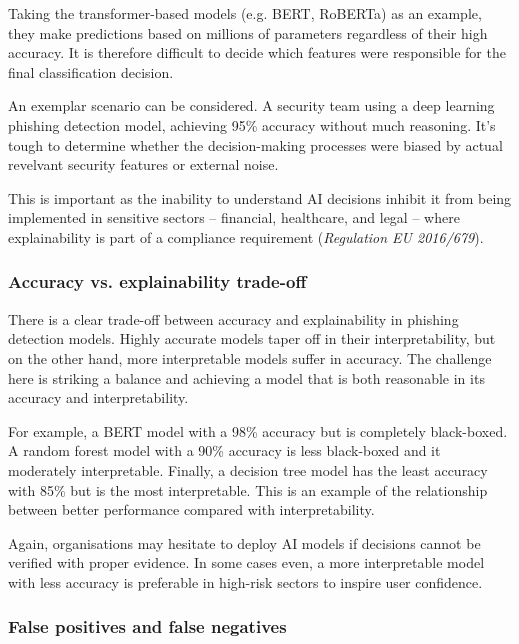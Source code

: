 \noindent Taking the transformer-based models (e.g. BERT, RoBERTa) as an example, they make predictions based on millions of parameters regardless of their high accuracy. It is therefore difficult to decide which features were responsible for the final classification decision.\newline

\noindent An exemplar scenario can be considered. A security team using a deep learning phishing detection model, achieving 95\% accuracy without much reasoning. It's tough to determine whether the decision-making processes were biased by actual revelvant security features or external noise.\newline

\noindent This is important as the inability to understand AI decisions inhibit it from being implemented in sensitive sectors -- financial, healthcare, and legal -- where explainability is part of a compliance requirement (\textit{Regulation EU 2016/679}).

\subsubsection*{Accuracy vs. explainability trade-off}
There is a clear trade-off between accuracy and explainability in phishing detection models. Highly accurate models taper off in their interpretability, but on the other hand, more interpretable models suffer in accuracy. The challenge here is striking a balance and achieving a model that is both reasonable in its accuracy and interpretability.\newline

\noindent For example, a BERT model with a 98\% accuracy but is completely black-boxed. A random forest model with a 90\% accuracy is less black-boxed and it moderately interpretable. Finally, a decision tree model has the least accuracy with 85\% but is the most interpretable. This is an example of the relationship between better performance compared with interpretability.\newline

\noindent Again, organisations may hesitate to deploy AI models if decisions cannot be verified with proper evidence. In some cases even, a more interpretable model with less accuracy is preferable in high-risk sectors to inspire user confidence.

\subsubsection*{False positives and false negatives}

